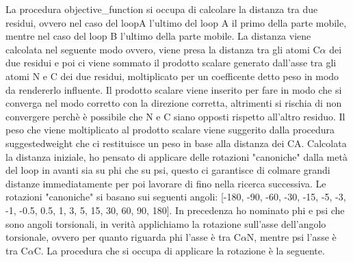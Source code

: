 La procedura objective\_function si occupa di calcolare la distanza tra due residui, ovvero nel caso del loopA l'ultimo del loop A il primo della parte mobile, mentre
nel caso del loop B l'ultimo della parte mobile. La distanza viene calcolata nel seguente modo ovvero, viene presa la distanza tra gli atomi C$\alpha$ dei due residui e
poi ci viene sommato il prodotto scalare generato dall'asse tra gli atomi N e C dei due residui, moltiplicato per un coefficente detto peso in modo da rendererlo influente.
Il prodotto scalare viene inserito per fare in modo che si converga nel modo corretto con la direzione corretta, altrimenti si rischia di non convergere perchè è possibile 
che N e C siano opposti rispetto all'altro residuo. Il peso che viene moltiplicato al prodotto scalare viene suggerito dalla procedura suggestedweight che ci restituisce
un peso in base alla distanza dei CA. Calcolata la distanza iniziale, ho pensato di applicare delle rotazioni "canoniche" dalla metà del loop in avanti sia su phi che su 
psi, questo ci garantisce di colmare grandi distanze immediatamente per poi lavorare di fino nella ricerca successiva. Le rotazioni "canoniche" si basano sui seguenti 
angoli: [-180, -90, -60, -30, -15, -5, -3, -1, -0.5, 0.5, 1, 3, 5, 15, 30, 60, 90, 180]. In precedenza ho nominato phi e psi che sono angoli torsionali, in verità applichiamo
la rotazione sull'asse dell'angolo torsionale, ovvero per quanto riguarda phi l'asse è tra C$\alpha$\-N, mentre psi l'asse è tra C$\alpha$\-C. La procedura che si occupa di 
applicare la rotazione è la seguente.

